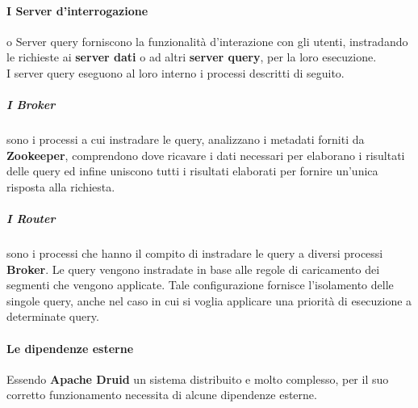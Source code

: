\paragraph{I Server d'interrogazione} o Server query forniscono la funzionalità d'interazione con gli utenti, instradando le richieste  
ai \textbf{server dati} o ad altri \textbf{server query}, per la loro esecuzione. \\
I server query eseguono al loro interno i processi descritti di seguito.
\subparagraph{I Broker} sono i processi a cui instradare le query, analizzano i \gls{metadati}{} forniti
da \textbf{Zookeeper}, comprendono dove ricavare i dati necessari per elaborano i risultati delle query ed 
infine uniscono tutti i risultati elaborati per fornire un’unica risposta alla richiesta.\\
\subparagraph{I Router} sono i processi che hanno il compito di instradare le query a diversi processi \textbf{Broker}. Le query
vengono instradate in base alle regole di caricamento dei segmenti che vengono applicate.
Tale configurazione fornisce l’isolamento delle singole query, anche nel caso in cui si voglia applicare 
una priorità di esecuzione a determinate query.\\

\paragraph{Le dipendenze esterne}
Essendo \textbf{Apache Druid} un sistema distribuito e molto complesso, per il suo corretto funzionamento necessita di alcune dipendenze esterne.\\

